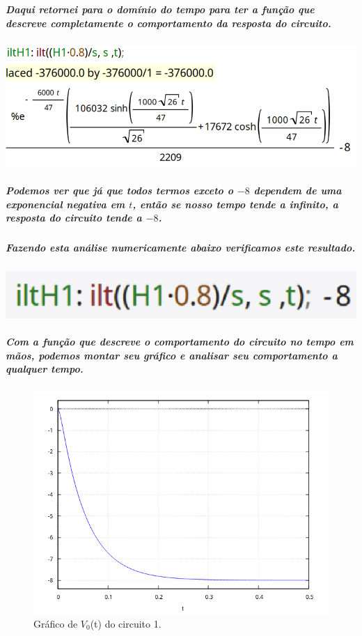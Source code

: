 \documentclass[12pt,twoside, a4paper, twocolumn]{article}
\begin{document}
\subparagraph*{}


\subparagraph*{Daqui retornei para o domínio do tempo para ter a função que descreve completamente o comportamento  da resposta do circuito.}
\pagebreak
\subparagraph*{}




\begin{adjustbox}{scale=0.35}
    \includegraphics{iltH1.png}
\end{adjustbox}


\subparagraph*{Podemos ver que já que todos termos exceto o $-8$ dependem de uma exponencial negativa em $t$, então se nosso tempo tende a infinito, a resposta do circuito tende a $-8$.}


\subparagraph*{Fazendo esta análise numericamente abaixo verificamos este resultado.}


\subparagraph*{}


\begin{adjustbox}{scale=0.35}
    \includegraphics{limH1.png}
\end{adjustbox}


\subparagraph*{Com a função que descreve o comportamento do circuito no tempo em mãos, podemos montar seu gráfico e analisar seu comportamento a qualquer tempo.}
\subparagraph*{}


\begin{figure}[h]
    \centering
    \includegraphics[width=1\columnwidth]{images/graficoH1t.png}
    \caption{Gráfico de $V_0$(t) do circuito 1.}
\end{figure}
\end{document}
